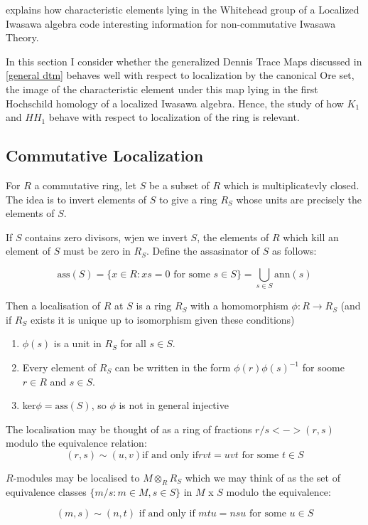 \cite{CFKSV} explains how characteristic elements lying in the Whitehead group of a Localized Iwasawa algebra code interesting information for non-commutative Iwasawa Theory.

In this section I consider whether the generalized Dennis Trace Maps discussed in \ref{general dtm} behaves well with respect to localization by the canonical Ore set, the image of the characteristic element under this map lying in the first Hochschild homology of a localized Iwasawa algebra. Hence, the study of how $K_1$ and $HH_1$ behave with respect to localization of the ring is relevant.

\subsection{Commutative Localization}
For $R$ a commutative ring, let $S$ be a subset of $R$ which is multiplicatevly closed. The idea is to invert elements of $S$ to give a ring $R_S$ whose units are precisely the elements of $S$.

If $S$ contains zero divisors, wjen we invert $S$, the elements of $R$ which kill an element of $S$ must be zero in $R_S$. Define the assasinator of $S$ as follows:

$$\text{ass}(S) = \{ x\in R:xs=0\text{ for some } s\in S\} = \bigcup_{s\in S} \text{ann}(s)$$


Then a localisation of $R$ at $S$ is a ring $R_S$ with a homomorphism $\phi:R\rightarrow R_S$ (and if $R_S$ exists it is unique up to isomorphism given these conditions)
\begin{enumerate}
\item $\phi(s)$ is a unit in $R_S$ for all $s\in S$.
\item Every element of $R_S$ can be written in the form $\phi(r) \phi(s)^{-1}$ for soome $r\in R$ and $s\in S$.
\item ker$\phi = \text{ass}(S)$, so $\phi$ is not in general injective
\end{enumerate}

The localisation may be thought of as a ring of fractions $r/s <-> (r,s)$ modulo the equivalence relation:
$$(r,s)\sim (u,v) \text{if and only if} rvt=uvt \text{ for some } t\in S$$

$R$-modules may be localised to $M\otimes_R R_S$ which we may think of as the set of equivalence classes $\{m/s : m\in M, s\in S\}$ in $M$ x $S$ modulo the equivalence:

$$(m,s)\sim (n,t) \text{ if and only if } mtu = nsu \text{ for some } u\in S$$

